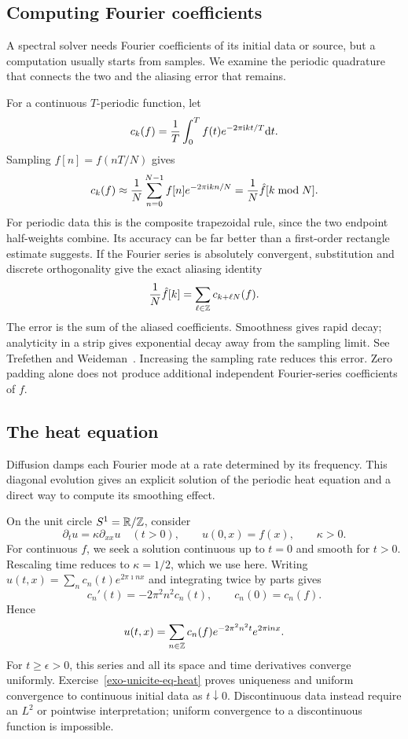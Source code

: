 \subsection{Computing Fourier coefficients}
\label{sect2-calcul-coef-fourier}

A spectral solver needs Fourier coefficients of its initial data or source,
but a computation usually starts from samples. We examine the periodic
quadrature that connects the two and the aliasing error that remains.

For a continuous $T$-periodic function, let
\[
 c_k(f)=\frac1T\int_0^T f(t)e^{-2\pi\mathrm{i} kt/T}\mathrm{d} t.
\]
Sampling $f[n]=f(nT/N)$ gives
\begin{equation}
\label{eq-lien-fft-calcul-coef-fourier}
 c_k(f)\approx\frac1N\sum_{n=0}^{N-1}f[n]e^{-2\pi\mathrm{i} kn/N}
             =\frac1N\hat{f}[k\bmod N].
\end{equation}
For periodic data this is the composite trapezoidal rule, since the two
endpoint half-weights combine. Its accuracy can be far better than a
first-order rectangle estimate suggests. If the Fourier series is absolutely
convergent, substitution and discrete orthogonality give the exact aliasing
identity
\[
 \frac1N\hat{f}[k]=\sum_{\ell\in\mathbb{Z}}c_{k+\ell N}(f).
\]
The error is the sum of the aliased coefficients. Smoothness gives rapid
decay; analyticity in a strip gives exponential decay away from the sampling
limit. See Trefethen and Weideman~\cite{trefethen-weideman-trapezoidal}.
Increasing the sampling rate reduces this error. Zero padding alone does
not produce additional independent Fourier-series coefficients of $f$.

\subsection{The heat equation}
\label{sect2-resol-eq-heat}

Diffusion damps each Fourier mode at a rate determined by its frequency.
This diagonal evolution gives an explicit solution of the periodic heat
equation and a direct way to compute its smoothing effect.

On the unit circle $S^1=\mathbb{R}/\mathbb{Z}$, consider
\begin{equation}
\label{heat-eq}
 \partial_tu=\kappa\partial_{xx}u\quad(t>0),\qquad u(0,x)=f(x),
 \qquad\kappa>0.
\end{equation}
For continuous $f$, we seek a solution continuous up to $t=0$ and smooth
for $t>0$. Rescaling time reduces to $\kappa=1/2$, which we use here.
Writing $u(t,x)=\sum_n c_n(t)e^{2\pi\imath nx}$ and integrating twice by
parts gives
\[
 c_n'(t)=-2\pi^2n^2c_n(t),\qquad c_n(0)=c_n(f).
\]
Hence
\begin{equation}
\label{eq-solution-heat-equation}
 u(t,x)=\sum_{n\in\mathbb{Z}}c_n(f)e^{-2\pi^2n^2t}e^{2\pi\mathrm{i} nx}.
\end{equation}
For $t\geq\epsilon>0$, this series and all its space and time derivatives
converge uniformly. Exercise~\ref{exo-unicite-eq-heat} proves uniqueness and
uniform convergence to continuous initial data as $t\downarrow0$.
Discontinuous data instead require an $L^2$ or pointwise interpretation;
uniform convergence to a discontinuous function is impossible.

